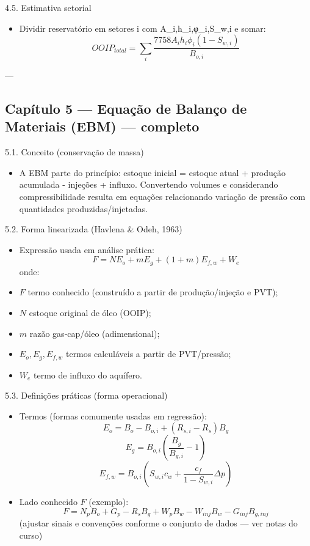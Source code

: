 \documentclass[11pt,a4paper]{article}
\begin{document}
4.5. Estimativa setorial
\begin{itemize}
\item Dividir reservatório em setores i com A_i,h_i,φ_i,S_{w,i} e somar:
$$OOIP_{total}=\sum_i \dfrac{7758 A_i h_i \phi_i (1-S_{w,i})}{B_{o,i}}$$
\end{itemize}

---

\subsection{Capítulo 5 — Equação de Balanço de Materiais (EBM) — completo}

5.1. Conceito (conservação de massa)
\begin{itemize}
\item A EBM parte do princípio: estoque inicial = estoque atual + produção acumulada - injeções + influxo. Convertendo volumes e considerando compressibilidade resulta em equações relacionando variação de pressão com quantidades produzidas/injetadas.
\end{itemize}

5.2. Forma linearizada (Havlena \& Odeh, 1963)
\begin{itemize}
\item Expressão usada em análise prática:
$$F = N E_o + m E_g + (1+m) E_{f,w} + W_e$$
onde:
\item $F$ termo conhecido (construído a partir de produção/injeção e PVT);
\item $N$ estoque original de óleo (OOIP);
\item $m$ razão gas‑cap/óleo (adimensional);
\item $E_o,E_g,E_{f,w}$ termos calculáveis a partir de PVT/pressão;
\item $W_e$ termo de influxo do aquífero.
\end{itemize}

5.3. Definições práticas (forma operacional)
\begin{itemize}
\item Termos (formas comumente usadas em regressão):
$$E_o = B_o - B_{o,i} + (R_{s,i}-R_s)B_g$$
$$E_g = B_{o,i}\left(\dfrac{B_g}{B_{g,i}} - 1\right)$$
$$E_{f,w}=B_{o,i}\left(S_{w,i}c_w + \dfrac{c_f}{1-S_{w,i}}\Delta p\right)$$
\item Lado conhecido $F$ (exemplo):
$$F = N_p B_o + G_p - R_s B_g + W_p B_w - W_{inj} B_w - G_{inj} B_{g,inj}$$
(ajustar sinais e convenções conforme o conjunto de dados — ver notas do curso)
\end{itemize}
\end{document}
